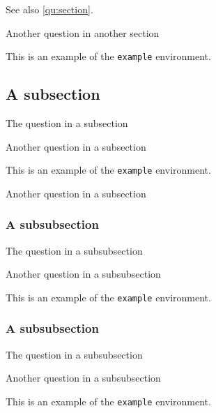 \documentclass{scrartcl}
\begin{document}
See also \ref{qu:section}.

\begin{question}
Another question in another section
\end{question}

\begin{example}
    This is an example of the \texttt{example} environment.
\end{example}

\subsection{A subsection}

\begin{question}
The question in a subsection
\end{question}

\begin{question}
Another question in a subsection
\end{question}

\begin{example}
    This is an example of the \texttt{example} environment.
\end{example}

\begin{question}
Another question in a subsection
\end{question}

\subsubsection{A subsubsection}

\begin{question}
The question in a subsubsection
\end{question}

\begin{question}
Another question in a subsubsection
\end{question}

\begin{example}
    This is an example of the \texttt{example} environment.
\end{example}

\subsubsection{A subsubsection}

\begin{question}
The question in a subsubsection
\end{question}

\begin{question}
Another question in a subsubsection
\end{question}

\begin{example}
    This is an example of the \texttt{example} environment.
\end{example}
\end{document}
